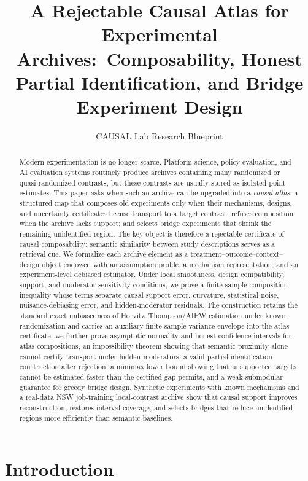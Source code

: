 \documentclass[11pt]{article}
\title{A Rejectable Causal Atlas for Experimental Archives:\ Composability, Honest Partial Identification, and Bridge Experiment Design}
\author{CAUSAL Lab Research Blueprint}
\date{}
\numberwithin{equation}{section}
\newcommand{\1}{\mathbf 1}
\begin{document}
\maketitle

\begin{abstract}
Modern experimentation is no longer scarce.  Platform science, policy evaluation, and AI evaluation systems routinely produce archives containing many randomized or quasi-randomized contrasts, but these contrasts are usually stored as isolated point estimates.  This paper asks when such an archive can be upgraded into a \emph{causal atlas}: a structured map that composes old experiments only when their mechanisms, designs, and uncertainty certificates license transport to a target contrast; refuses composition when the archive lacks support; and selects bridge experiments that shrink the remaining unidentified region.  The key object is therefore a rejectable certificate of causal composability; semantic similarity between study descriptions serves as a retrieval cue.  We formalize each archive element as a treatment--outcome--context--design object endowed with an assumption profile, a mechanism representation, and an experiment-level debiased estimator.  Under local smoothness, design compatibility, support, and moderator-sensitivity conditions, we prove a finite-sample composition inequality whose terms separate causal support error, curvature, statistical noise, nuisance-debiasing error, and hidden-moderator residuals.  The construction retains the standard exact unbiasedness of Horvitz–Thompson/AIPW estimation under known randomization and carries an auxiliary finite-sample variance envelope into the atlas certificate; we further prove asymptotic normality and honest confidence intervals for atlas compositions, an impossibility theorem showing that semantic proximity alone cannot certify transport under hidden moderators, a valid partial-identification construction after rejection, a minimax lower bound showing that unsupported targets cannot be estimated faster than the certified gap permits, and a weak-submodular guarantee for greedy bridge design.  Synthetic experiments with known mechanisms and a real-data NSW job-training local-contrast archive show that causal support improves reconstruction, restores interval coverage, and selects bridges that reduce unidentified regions more efficiently than semantic baselines.
\end{abstract}

\section{Introduction}
\label{sec:introduction}
\end{document}
